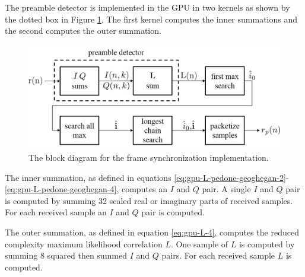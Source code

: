 The preamble detector is implemented in the GPU in two kernels as shown by the dotted box in Figure \ref{fig:preambleBlock}.
The first kernel computes the inner summations and the second computes the outer summation.
\begin{figure}
	\centering\includegraphics[width=\textwidth/10*8]{figures/gpu/preambleBlock.png}
	\caption{The block diagram for the frame synchronization implementation.}
	\label{fig:preambleBlock}
\end{figure}

The inner summation, as defined in equations \eqref{eq:gpu-L-pedone-geoghegan-2}-\eqref{eq:gpu-L-pedone-geoghegan-4}, computes an $I$ and $Q$ pair.
A single $I$ and $Q$ pair is computed by summing 32 scaled real or imaginary parts of received samples.
For each received sample an $I$ and $Q$ pair is computed.

The outer summation, as defined in equation \eqref{eq:gpu-L-4}, computes the reduced complexity maximum likelihood correlation $L$.
One sample of $L$ is computed by summing 8 squared then summed $I$ and $Q$ pairs.
For each received sample $L$ is computed.

